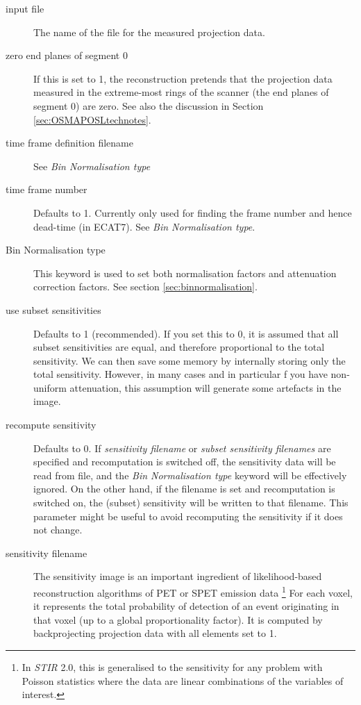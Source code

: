\documentclass{article}
\begin{document}
\begin{description}

\item[input file]
The name of the file for the measured projection data. 


\item[zero end planes of segment 0]
If this is set to 1, the reconstruction pretends that the projection 
data measured in the extreme-most rings of the scanner (the end 
planes of segment 0) are zero. See also the discussion in Section 
\ref{sec:OSMAPOSLtechnotes}.


\item[time frame definition filename]
See \textit{Bin Normalisation type}

\item[time frame number]
Defaults to 1. Currently only used for finding the frame number and hence dead-time (in ECAT7).
See \textit{Bin Normalisation type}.

\item[Bin Normalisation type]
This keyword is used to set both normalisation factors and attenuation
correction factors. See section \ref{sec:binnormalisation}.

\item[use subset sensitivities]
Defaults to 1 (recommended).
If you set this to 0, it is assumed that all subset sensitivities are equal, and therefore proportional 
to the total sensitivity. We can then save some memory by internally storing only the total sensitivity. 
However, in many cases and in particular f you have non-uniform attenuation, 
this assumption will generate some artefacts in the image.

\item[recompute sensitivity]
Defaults to 0. If \textit{sensitivity filename} or \textit{subset sensitivity filenames} 
are specified and recomputation is switched off, the sensitivity data will be read
from file, and the 
\textit{Bin Normalisation type} keyword will be effectively ignored.
On the other hand, if the filename is set and recomputation is switched on, the
(subset) sensitivity will be written to that filename. This parameter might be useful
to avoid recomputing the sensitivity if it does not change.

\item[sensitivity filename]
The sensitivity image is an important ingredient of 
likelihood-based reconstruction algorithms of PET or SPET emission data
\footnote{In \textit{STIR} 2.0, this is generalised to the sensitivity for
any problem with Poisson statistics where the data are linear
combinations of the variables of interest.}
For each voxel, it represents the total probability of detection of an 
event originating in that voxel (up to a global proportionality factor).
It is computed by backprojecting projection data with all elements set to 1.


\end{description}
\end{document}
